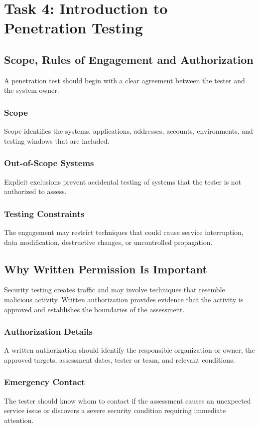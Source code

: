 \documentclass[11pt,a4paper]{article}
\begin{document}
\newpage
\section{Task 4: Introduction to Penetration Testing}


\subsection{Scope, Rules of Engagement and Authorization}
A penetration test should begin with a clear agreement between the tester and the system owner.

\subsubsection{Scope}
Scope identifies the systems, applications, addresses, accounts, environments, and testing windows that are included.

\subsubsection{Out-of-Scope Systems}
Explicit exclusions prevent accidental testing of systems that the tester is not authorized to assess.

\subsubsection{Testing Constraints}
The engagement may restrict techniques that could cause service interruption, data modification, destructive changes, or uncontrolled propagation.

\subsection{Why Written Permission Is Important}
Security testing creates traffic and may involve techniques that resemble malicious activity. Written authorization provides evidence that the activity is approved and establishes the boundaries of the assessment.

\subsubsection{Authorization Details}
A written authorization should identify the responsible organization or owner, the approved targets, assessment dates, tester or team, and relevant conditions.

\subsubsection{Emergency Contact}
The tester should know whom to contact if the assessment causes an unexpected service issue or discovers a severe security condition requiring immediate attention.
\end{document}
